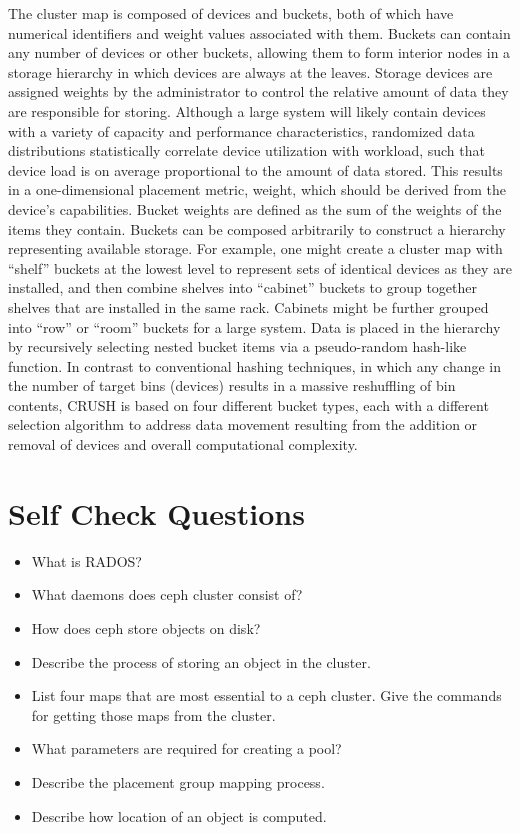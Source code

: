 \documentclass[12pt,a4paper]{report}
\begin{document}
The cluster map is composed of devices and buckets, both of which have
numerical identifiers and weight values associated with them. Buckets can
contain any number of devices or other buckets, allowing them to form interior
nodes in a storage hierarchy in which devices are always at the leaves. Storage
devices are assigned weights by the administrator to control the relative
amount of data they are responsible for storing.  Although a large system will
likely contain devices with a variety of capacity and performance
characteristics, randomized  data  distributions  statistically  correlate
device utilization with workload, such that device load is on average
proportional to the amount of data stored. This results in a one-dimensional
placement metric, weight, which should be derived from the device's
capabilities. Bucket weights are defined as the sum of the weights of the items
they contain. Buckets can be composed arbitrarily to construct a hierarchy
representing available storage. For example, one might create a cluster map
with ``shelf'' buckets at the lowest level to  represent sets  of  identical
devices as  they  are  installed, and  then  combine shelves into ``cabinet''
buckets to  group together shelves that are installed in the same rack.
Cabinets might be further grouped into ``row'' or ``room'' buckets for a large
system.  Data is placed in the hierarchy by recursively selecting nested bucket
items via a pseudo-random hash-like function. In contrast to conventional
hashing techniques, in which any change in the number of target bins (devices)
results  in  a  massive  reshuffling  of  bin  contents,  CRUSH  is based on
four different bucket types,  each with a different selection algorithm to
address data movement resulting from the addition or removal of devices and
overall computational complexity.

\section{Self Check Questions}

\begin{itemize}
	\item What is RADOS?

	\item What daemons does ceph cluster consist of?

	\item How does ceph store objects on disk?

	\item Describe the process of storing an object in the cluster.

	\item List four maps that are most essential to a ceph cluster. Give
		the commands for getting those maps from the cluster.

	\item What parameters are required for creating a pool?

	\item Describe the placement group mapping process.

	\item Describe how location of an object is computed.
\end{itemize}
\end{document}
